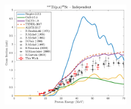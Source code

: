 \begin{figure}
 \includegraphics[width=0.49\textwidth]{./figures/48Sc.pdf}

\vspace{-20pt} 
\end{figure}

